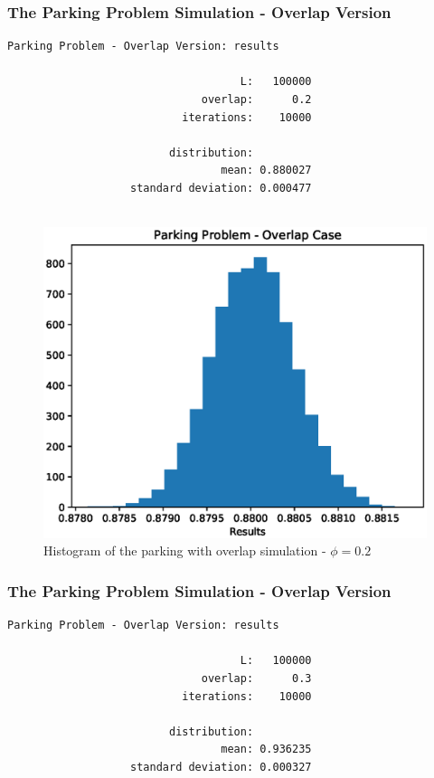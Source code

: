 \documentclass{beamer}
\begin{document}
\begin{frame}[fragile]
	\frametitle{The Parking Problem Simulation - Overlap Version}
	\begin{lstlisting}[numbers=none]
    Parking Problem - Overlap Version: results

                                    L:   100000
                              overlap:      0.2
                           iterations:    10000

                         distribution:
                                 mean: 0.880027
                   standard deviation: 0.000477
	
	\end{lstlisting}
\end{frame}

\begin{frame}
	\begin{figure}
		\centering
		\includegraphics[scale = 0.5]{parking_simulation_04.eps}
		\caption{Histogram of the parking with overlap simulation - $\phi = 0.2$}
	\end{figure}
\end{frame}

\begin{frame}[fragile]
	\frametitle{The Parking Problem Simulation - Overlap Version}
	\begin{lstlisting}[numbers=none]
    Parking Problem - Overlap Version: results

                                    L:   100000
                              overlap:      0.3
                           iterations:    10000

                         distribution:
                                 mean: 0.936235
                   standard deviation: 0.000327
	
	\end{lstlisting}
\end{frame}
\end{document}
